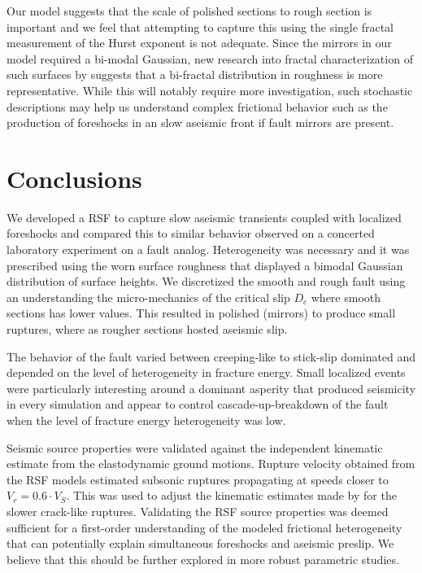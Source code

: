 \documentclass[preprint,1p, 10pt,authoryear]{elsarticle}
\begin{document}
Our model suggests that the scale of polished sections to rough section is important and we feel that attempting to capture this using the single fractal measurement of the Hurst exponent is not adequate.  Since the mirrors in our model required a bi-modal Gaussian, new research into fractal characterization of such surfaces by \citet{Hu2019} suggests that a bi-fractal distribution in roughness is more representative. While this will notably require more investigation, such stochastic descriptions may help us understand complex frictional behavior such as the production of foreshocks in an slow aseismic front if fault mirrors are present.

\section{Conclusions}
We developed a RSF to capture slow aseismic transients coupled with localized foreshocks and compared this to similar behavior observed on a concerted laboratory experiment on a fault analog. Heterogeneity was necessary and it was prescribed using the worn surface roughness that displayed a bimodal Gaussian distribution of surface heights. We discretized the smooth and rough fault using an understanding the micro-mechanics of the critical slip $D_{c}$ where smooth sections has lower values. This resulted in polished (mirrors) to produce small ruptures, where as rougher sections hosted aseismic slip.  

The behavior of the fault varied between creeping-like to stick-slip dominated and depended on the level of heterogeneity in fracture energy. Small localized events were particularly interesting around a dominant asperity that produced seismicity in every simulation and appear to control cascade-up-breakdown of the fault when the level of fracture energy heterogeneity was low. 

Seismic source properties were validated against the independent kinematic estimate from the elastodynamic ground motions.  Rupture velocity obtained from the RSF models estimated subsonic ruptures propagating at speeds closer to $V_r = 0.6\cdot V_{S}$.  This was used to adjust the kinematic estimates made by \citet{Selvadurai2019} for the slower crack-like ruptures. Validating the RSF source properties was deemed sufficient for a first-order understanding of the modeled frictional heterogeneity that can potentially explain simultaneous foreshocks and aseismic preslip. We believe that this should be further explored in more robust parametric studies. 
\end{document}

